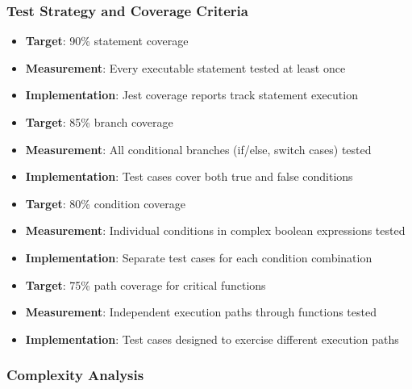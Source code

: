 \subsubsection{Test Strategy and Coverage Criteria}


\begin{itemize}
    \item \textbf{Target}: 90\% statement coverage
    \item \textbf{Measurement}: Every executable statement tested at least once
    \item \textbf{Implementation}: Jest coverage reports track statement execution
\end{itemize}

\begin{itemize}
    \item \textbf{Target}: 85\% branch coverage
    \item \textbf{Measurement}: All conditional branches (if/else, switch cases) tested
    \item \textbf{Implementation}: Test cases cover both true and false conditions
\end{itemize}

\begin{itemize}
    \item \textbf{Target}: 80\% condition coverage
    \item \textbf{Measurement}: Individual conditions in complex boolean expressions tested
    \item \textbf{Implementation}: Separate test cases for each condition combination
\end{itemize}

\begin{itemize}
    \item \textbf{Target}: 75\% path coverage for critical functions
    \item \textbf{Measurement}: Independent execution paths through functions tested
    \item \textbf{Implementation}: Test cases designed to exercise different execution paths
\end{itemize}

\subsubsection{Complexity Analysis}

